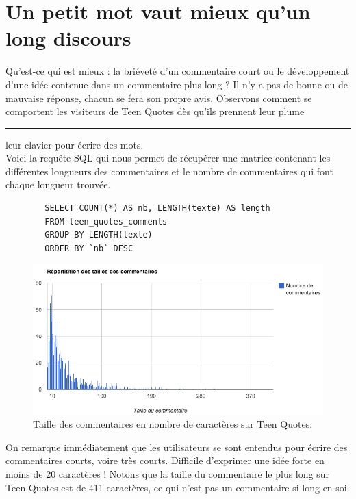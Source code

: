 \documentclass{report}
\newlength{\textlarg}
\newcommand{\barre}[1]{%
   \settowidth{\textlarg}{#1}
   #1\hspace{-\textlarg}\rule[0.5ex]{\textlarg}{0.5pt}}
\begin{document}
	\section{Un petit mot vaut mieux qu'un long discours}
	Qu'est-ce qui est mieux : la briéveté d'un commentaire court ou le développement d'une idée contenue dans un commentaire plus long ? Il n'y a pas de bonne ou de mauvaise réponse, chacun se fera son propre avis. Observons comment se comportent les visiteurs de Teen Quotes dès qu'ils prennent \barre{leur plume} leur clavier pour écrire des mots.\\

	Voici la requête SQL qui nous permet de récupérer une matrice contenant les différentes longueurs des commentaires et le nombre de commentaires qui font chaque longueur trouvée.

	\begin{lstlisting}
		SELECT COUNT(*) AS nb, LENGTH(texte) AS length
		FROM teen_quotes_comments 
		GROUP BY LENGTH(texte)
		ORDER BY `nb` DESC
	\end{lstlisting}

	\begin{figure}[H]
		\center
		\includegraphics[width=470px]{images/tailleCommentaires.png}
		\caption{Taille des commentaires en nombre de caractères sur Teen Quotes.}
	\end{figure}

	On remarque immédiatement que les utilisateurs se sont entendus pour écrire des commentaires courts, voire très courts. Difficile d'exprimer une idée forte en moins de 20 caractères ! Notons que la taille du commentaire le plus long sur Teen Quotes est de 411 caractères, ce qui n'est pas un commentaire si long en soi.\\
\end{document}
